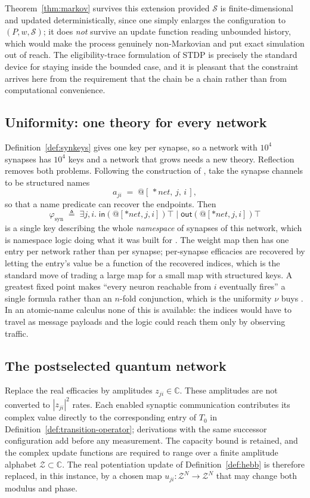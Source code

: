 \documentclass[11pt,a4paper]{article}
\theoremstyle{plain}
\theoremstyle{definition}
\theoremstyle{remark}
\newcommand{\sepc}{\mathbin{\big|}}
\newcommand{\out}{\mathsf{out}}
\newcommand{\inn}{\mathsf{in}}
\newcommand{\Cx}{\mathbb{C}}
\newcommand{\wmap}{w}
\begin{document}
Theorem~\ref{thm:markov} survives this extension provided $\mathcal{S}$ is finite-dimensional and
updated deterministically, since one simply enlarges the configuration to
$(P, \wmap, \mathcal{S})$; it does \emph{not} survive an update function reading unbounded history,
which would make the process genuinely non-Markovian and put exact simulation out of reach. The
eligibility-trace formulation of STDP is precisely the standard device for staying inside the
bounded case, and it is pleasant that the constraint arrives here from the requirement that the
chain be a chain rather than from computational convenience.

\subsection{Uniformity: one theory for every network}
\label{sec:rnn-uniform}

Definition~\ref{def:synkeys} gives one key per synapse, so a network with $10^4$ synapses has $10^4$
keys and a network that grows needs a new theory. Reflection removes both problems. Following the
construction of \cite{knots}, take the synapse channels to be structured names
\[
a_{ji} \;=\; @[\,*\mathit{net},\, j,\, i\,],
\]
so that a name predicate can recover the endpoints. Then
\[
\varphi_{\mathrm{syn}} \;\triangleq\; \exists j, i.\; \inn(@[*\mathit{net},j,i])\top \;\sepc\; \out(@[*\mathit{net},j,i])\top
\]
is a single key describing the whole \emph{namespace} of synapses of this network, which is
namespace logic doing what it was built for \cite{namespace}. The weight map then has one entry per
network rather than per synapse; per-synapse efficacies are recovered by letting the entry's value be
a function of the recovered indices, which is the standard move of trading a large map for a small
map with structured keys. A greatest fixed point makes ``every neuron reachable from $i$ eventually
fires'' a single formula rather than an $n$-fold conjunction, which is the uniformity $\nu$ buys
\cite[\S3]{classifier}. In an atomic-name calculus none of this is available: the indices would have
to travel as message payloads and the logic could reach them only by observing traffic.

\subsection{The postselected quantum network}
\label{sec:rnn-quantum}

Replace the real efficacies by amplitudes $z_{ji}\in\Cx$. These amplitudes are not converted to
$|z_{ji}|^2$ rates. Each enabled synaptic communication contributes its complex value directly to
the corresponding entry of $T_0$ in Definition~\ref{def:transition-operator}; derivations with the
same successor configuration add before any measurement. The capacity bound is retained, and the
complex update functions are required to range over a finite amplitude alphabet
$\mathcal{Z}\subset\Cx$. The real potentiation update of Definition~\ref{def:hebb} is therefore
replaced, in this instance, by a chosen map $u_{ji}:\mathcal{Z}^N\to\mathcal{Z}^N$ that may change
both modulus and phase.
\end{document}
